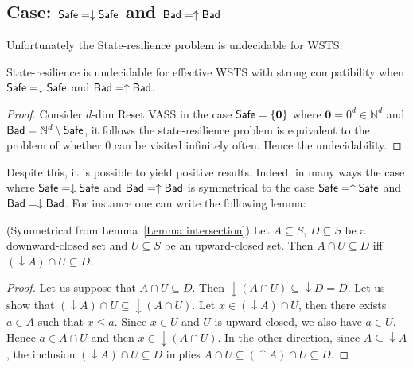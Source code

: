 \subsection{Case: $\textsf{Safe} = \downarrow \textsf{Safe}$ and $\textsf{Bad} = \uparrow \textsf{Bad}$}



Unfortunately the {\sc State-resilience} problem is undecidable for WSTS.

\begin{theorem}\label{srp down up}
{\sc State-resilience} is undecidable for effective WSTS with  strong  compatibility 
when
$\textsf{Safe}=\downarrow \textsf{Safe}$
and $\textsf{Bad}=\uparrow \textsf{Bad}$.
\end{theorem}

\begin{proof}
Consider $d$-dim Reset VASS
in the case $\textsf{Safe}=\{ \textbf{0} \}$ where  $ \textbf{0} = 0^d \in \mathbb{N}^d$ 
and $\textsf{Bad} = \mathbb{N}^d \setminus \textsf{Safe}$, 
it follows the 
state-resilience problem 
is equivalent 
to the problem of whether $0$ can be visited infinitely often. 
Hence the undecidability.
\end{proof}


Despite this, it is possible to yield positive results. Indeed, in many ways the case where $\textsf{Safe} = \downarrow \textsf{Safe}$ and $\textsf{Bad} = \uparrow \textsf{Bad}$
is symmetrical to the case $\textsf{Safe} = \uparrow \textsf{Safe}$ and $\textsf{Bad} = \downarrow \textsf{Bad}$.
%
For instance one can write the following lemma:

\begin{lemma}(Symmetrical from Lemma~\ref{Lemma intersection})\label{Lemma intersection 2}
Let $A \subseteq S$, $D \subseteq S$ be a downward-closed set and $U \subseteq S$ be an upward-closed set. 
Then $A \cap U \subseteq D$  iff $ (\downarrow  A) \cap U \subseteq D$.
\end{lemma}

\begin{proof}
Let us suppose that $A \cap U \subseteq D$. Then ${\downarrow (A \cap U)} \subseteq {\downarrow D} = D$. Let us show that $({\downarrow A}) \cap U \subseteq {\downarrow (A \cap U)}$. Let $x \in ({\downarrow A}) \cap U$, then there exists $a \in A$ such that $x \leq a$. Since $x \in U$ and $U$ is upward-closed, we also have $a \in U$. Hence $a \in A \cap U$ and then $x \in { \downarrow (A \cap U)}$. In the other direction, since $A \subseteq {\downarrow A}$, the inclusion $({\downarrow  A}) \cap U \subseteq D$ implies $A \cap U \subseteq ({\uparrow  A}) \cap U \subseteq D$.
\end{proof}


